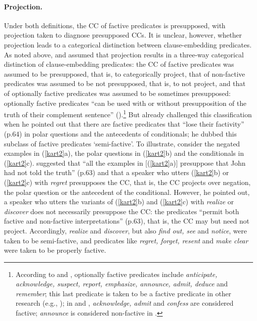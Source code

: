 \documentclass[11pt,fleqn]{article}
\newcommand{\6}{\mbox{$[\hspace*{-.6mm}[$}}
\newcommand{\9}{\mbox{$]\hspace*{-.6mm}]$}}
\begin{document}
\paragraph{Projection.} Under both definitions, the CC of factive predicates is presupposed, with projection taken to diagnose presupposed CCs. It is unclear, however, whether projection leads to a categorical distinction between clause-embedding predicates. As noted above, \citet{kiparsky-kiparsky70} and \citet{karttunen71-implicative} assumed that projection results in a three-way categorical distinction of clause-embedding predicates:  the CC of factive predicates was assumed to be presupposed, that is, to categorically project, that of non-factive predicates was assumed to be not presupposed, that is, to not project, and that of optionally factive predicates was assumed to be sometimes presupposed: optionally factive predicates ``can be used with or without presupposition of the truth of their complement sentence'' (\citealt[340]{karttunen71-implicative}).\footnote{According to \citet{kiparsky-kiparsky70} and \citet{karttunen71-implicative}, optionally factive predicates include {\em anticipate, acknowledge, suspect, report, emphasize, announce, admit, deduce} and {\em remember}; this last predicate is taken to be a factive predicate in other research (e.g., \citealt{simons07,kastner2015,abrusan2016,karttunen2016,aravind-hackl2017,cremers2018}); in \citealt{karttunen-zaenen2005} and \citealt{karttunen2016}, {\em acknowledge, admit} and {\em confess} are considered factive; {\em announce} is considered non-factive in \citealt{karttunen-zaenen2005}.} But \citet{karttunen71b} already challenged this classification when he pointed out that there are factive predicates that ``lose their factivity'' (p.64) in polar questions and the antecedents of conditionals; he dubbed this subclass of factive predicates `semi-factive'. To illustrate, consider the negated examples in (\ref{kart2}a), the polar questions in (\ref{kart2}b) and the conditionals in (\ref{kart2}c). \citet{karttunen71b} suggested that ``all the examples in [(\ref{kart2}a)] presuppose that John had not told the truth'' (p.63) and that a speaker who utters (\ref{kart2}b) or (\ref{kart2}c) with {\em regret} presupposes the CC, that is, the CC projects over negation, the polar question or  the antecedent of the conditional. However, he pointed out, a speaker who utters the variants of (\ref{kart2}b) and (\ref{kart2}c) with {\em realize} or {\em discover} does not necessarily presuppose the CC: the predicates ``permit both factive and non-factive interpretations'' (p.63), that is, the CC may but need not project. Accordingly, {\em realize} and {\em discover}, but also {\em find out, see} and {\em notice}, were taken to be semi-factive, and predicates like {\em regret, forget, resent} and {\em make clear}  were taken to be properly factive.
\end{document}
